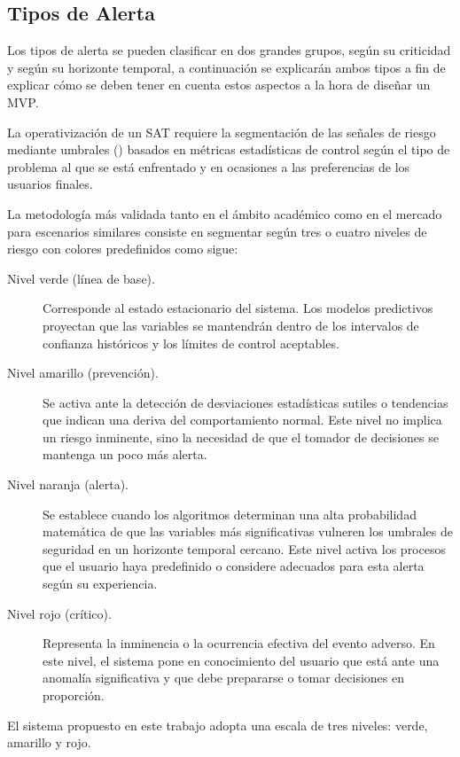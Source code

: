 \subsection{Tipos de Alerta}\label{tipos-de-alerta}

Los tipos de alerta se pueden clasificar en dos grandes grupos, según su criticidad y según su horizonte temporal, a continuación se explicarán ambos tipos a fin de explicar cómo se deben tener en cuenta estos aspectos a la hora de diseñar un MVP.

La operativización de un SAT requiere la segmentación de las señales de riesgo mediante umbrales () basados en métricas estadísticas de control según el tipo de problema al que se está enfrentado y en ocasiones a las preferencias de los usuarios finales.

La metodología más validada tanto en el ámbito académico como en el mercado para escenarios similares consiste en segmentar según tres o cuatro niveles de riesgo con colores predefinidos como sigue:

\begin{description}
  \item[Nivel verde (línea de base).] Corresponde al estado estacionario del sistema. Los modelos predictivos proyectan que las variables se mantendrán dentro de los intervalos de confianza históricos y los límites de control aceptables.
  \item[Nivel amarillo (prevención).] Se activa ante la detección de desviaciones estadísticas sutiles o tendencias que indican una deriva del comportamiento normal. Este nivel no implica un riesgo inminente, sino la necesidad de que el tomador de decisiones se mantenga un poco más alerta.
  \item[Nivel naranja (alerta).] Se establece cuando los algoritmos determinan una alta probabilidad matemática de que las variables más significativas vulneren los umbrales de seguridad en un horizonte temporal cercano. Este nivel activa los procesos que el usuario haya predefinido o considere adecuados para esta alerta según su experiencia.
  \item[Nivel rojo (crítico).] Representa la inminencia o la ocurrencia efectiva del evento adverso. En este nivel, el sistema pone en conocimiento del usuario que está ante una anomalía significativa y que debe prepararse o tomar decisiones en proporción.
\end{description}

El sistema propuesto en este trabajo adopta una escala de tres niveles: verde, amarillo y rojo.

